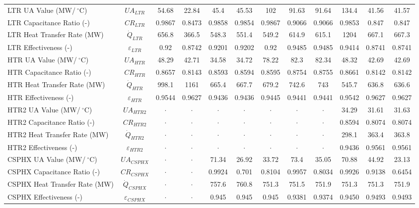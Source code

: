 \documentclass[sustainability,article,accept,moreauthors,pdftex]{Definitions/mdpi}
\begin{document}
\begin{specialtable}[H]
{\begin{tabular}{lc|cc|cc|ccc|ccc}
    LTR UA Value (MW/$~^{\circ}$C)	&	$UA_{LTR}$	&	54.68	&	22.84	&	45.4	&	45.53	&	102	&	91.63	&	91.64	&	134.4	&	41.56	&	41.57	\\
    LTR Capacitance Ratio (-)	&	$CR_{LTR}$	&	0.9867	&	0.8473	&	0.9858	&	0.9854	&	0.9867	&	0.9066	&	0.9066	&	0.9853	&	0.847	&	0.847	\\
    LTR Heat Transfer Rate (MW)	&	$\dot{Q}_{LTR}$	&	656.8	&	366.5	&	548.3	&	551.4	&	549.2	&	614.9	&	615.1	&	1204	&	667.1	&	667.3	\\
    LTR Effectiveness (-)	&	$\varepsilon_{LTR}$	&	0.92	&	0.8742	&	0.9201	&	0.9202	&	0.92	&	0.9485	&	0.9485	&	0.9414	&	0.8741	&	0.8741	\\
    HTR UA Value (MW/$~^{\circ}$C)	&	$UA_{HTR}$	&	48.29	&	42.71	&	34.58	&	34.72	&	78.22	&	82.3	&	82.34	&	48.32	&	42.69	&	42.69	\\
    HTR Capacitance Ratio (-)	&	$CR_{HTR}$	&	0.8657	&	0.8143	&	0.8593	&	0.8594	&	0.8595	&	0.8754	&	0.8755	&	0.8661	&	0.8142	&	0.8142	\\
    HTR Heat Transfer Rate (MW)	&	$\dot{Q}_{HTR}$	&	998.1	&	1161	&	665.4	&	667.7	&	679.2	&	742.6	&	743	&	545.7	&	636.8	&	636.6	\\
    HTR Effectiveness (-)	&	$\varepsilon_{HTR}$	&	0.9544	&	0.9627	&	0.9436	&	0.9436	&	0.9445	&	0.9441	&	0.9441	&	0.9542	&	0.9627	&	0.9627	\\
    HTR2 UA Value (MW/$~^{\circ}$C)	&	$UA_{HTR2}$	&	$\cdot$	&	$\cdot$	&	$\cdot$	&	$\cdot$	&	$\cdot$	&	$\cdot$	&	$\cdot$	&	34.29	&	31.61	&	31.63	\\
    HTR2 Capacitance Ratio (-)	&	$CR_{HTR2}$	&	$\cdot$	&	$\cdot$	&	$\cdot$	&	$\cdot$	&	$\cdot$	&	$\cdot$	&	$\cdot$	&	0.8594	&	0.8074	&	0.8074	\\
    HTR2 Heat Transfer Rate (MW)	&	$\dot{Q}_{HTR2}$	&	$\cdot$	&	$\cdot$	&	$\cdot$	&	$\cdot$	&	$\cdot$	&	$\cdot$	&	$\cdot$	&	298.1	&	363.4	&	363.8	\\
    HTR2 Effectiveness (-)	&	$\varepsilon_{HTR2}$	&	$\cdot$	&	$\cdot$	&	$\cdot$	&	$\cdot$	&	$\cdot$	&	$\cdot$	&	$\cdot$	&	0.9436	&	0.9561	&	0.9561	\\
    CSPHX UA Value (MW/$~^{\circ}$C)	&	$UA_{CSPHX}$	&	$\cdot$	&	$\cdot$	&	71.34	&	26.92	&	33.72	&	73.4	&	35.05	&	70.88	&	44.92	&	23.13	\\
    CSPHX Capacitance Ratio (-)	&	$CR_{CSPHX}$	&	$\cdot$	&	$\cdot$	&	0.9924	&	0.701	&	0.8104	&	0.9957	&	0.8034	&	0.9926	&	0.9138	&	0.6454	\\
    CSPHX Heat Transfer Rate (MW)	&	$\dot{Q}_{CSPHX}$	&	$\cdot$	&	$\cdot$	&	757.6	&	760.8	&	751.3	&	751.5	&	751.9	&	751.3	&	751.3	&	751.9	\\
    CSPHX Effectiveness (-)	&	$\varepsilon_{CSPHX}$	&	$\cdot$	&	$\cdot$	&	0.945	&	0.945	&	0.945	&	0.9381	&	0.9374	&	0.9450	&	0.9493	&	0.9493	\\
    \bottomrule
    \end{tabular}
    }
\end{specialtable}
\end{document}
